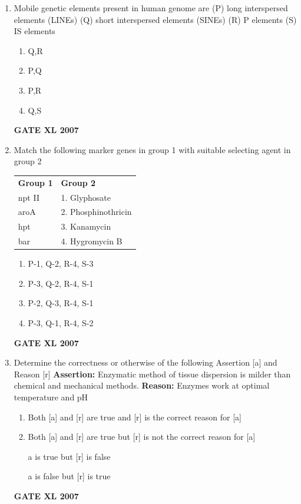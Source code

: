 \documentclass[journal,12pt,onecolumn]{IEEEtran}
\begin{document}
\begin{enumerate}
    \item Mobile genetic elements present in human genome are
(P) long interspersed elements (LINEs)
		(Q) short interspersed elements (SINEs)
		(R) P elements
        (S) IS elements
    \begin{enumerate}
        \item Q,R
        \item P,Q
        \item P,R
        \item Q,S
    \end{enumerate}
	    \hfill \textbf{GATE XL 2007}
    
    \item Match the following marker genes in group 1 with suitable selecting agent in group 2
    

	    \begin{tabularx}{\textwidth}{@{}lX@{}}
	    \textbf{Group 1} & \textbf{Group 2}\\
     npt II & 1. Glyphosate\\
     aroA & 2. Phosphinothricin\\
     hpt & 3. Kanamycin\\
     bar & 4. Hygromycin B\\
    \end{tabularx}
    \begin{enumerate}
        \item P-1, Q-2, R-4, S-3
        \item P-3, Q-2, R-4, S-1
        \item P-2, Q-3, R-4, S-1
        \item P-3, Q-1, R-4, S-2
    \end{enumerate}
	    \hfill \textbf{GATE XL 2007}
    
    \item Determine the correctness or otherwise of the following Assertion [a] and Reason [r]
        \textbf{Assertion:} Enzymatic method of tissue dispersion is milder than chemical and mechanical methods.
        \textbf{Reason:} Enzymes work at optimal temperature and pH
    \begin{enumerate}
        \item Both [a] and [r] are true and [r] is the correct reason for [a]
        \item Both [a] and [r] are true but [r] is not the correct reason for [a]
        \item [a] is true but [r] is false
        \item [a] is false but [r] is true
    \end{enumerate}
	    \hfill \textbf{GATE XL 2007}
    

\end{enumerate}
\end{document}
